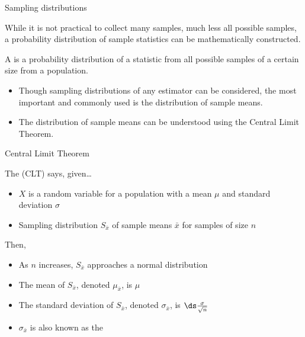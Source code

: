 \documentclass[xcolor=table, aspectratio=169, bigger, handout]{beamer}
\begin{document}
\begin{frame}{Sampling distributions}
\begin{block}{}
While it is not practical to collect many samples, much less all possible samples, a probability distribution of sample statistics can be mathematically constructed.
\end{block}

\pause
\begin{block}{}
A  is a probability distribution of a statistic from all possible samples of a certain size from a population.

\begin{itemize}
\pause\item Though sampling distributions of any estimator can be considered, the most important and commonly used is the distribution of sample means.
\pause\item The distribution of sample means can be understood using the Central Limit Theorem.
\end{itemize}
\end{block}

\end{frame}


\begin{frame}{Central Limit Theorem}
\begin{block}{}
The  (CLT) says, given\ldots
\begin{itemize}
\pause\item $X$ is a random variable for a population with a mean $\mu$ and standard deviation $\sigma$
\pause\item Sampling distribution $S_{\bar x}$ of sample means $\bar x$ for samples of size $n$
\end{itemize}
\bigskip
\pause Then,
\begin{itemize}
\item As $n$ increases, $S_{\bar x}$ approaches a normal distribution
\pause\item The mean of $S_{\bar x}$, denoted $\mu_{\bar x}$, is $\mu$
\pause\item The standard deviation of $S_{\bar x}$, denoted $\sigma_{\bar x}$, is $\ds \frac \sigma {\sqrt n}$  
\pause\item $\sigma_{\bar x}$ is also known as the 
\end{itemize}
\end{block}
\end{frame}
\end{document}
